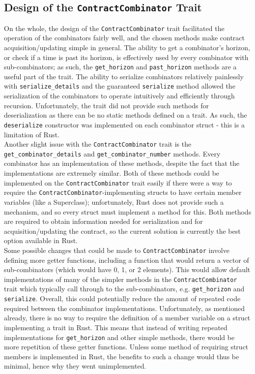 \subsection{Design of the \texttt{ContractCombinator} Trait}

On the whole, the design of the \texttt{ContractCombinator} trait facilitated the operation of the combinators fairly well, and the chosen methods make contract acquisition/updating simple in general. The ability to get a combinator's horizon, or check if a time is past its horizon, is effectively used by every combinator with sub-combinators; as such, the \texttt{get\_horizon} and \texttt{past\_horizon} methods are a useful part of the trait. The ability to serialize combinators relatively painlessly with \texttt{serialize\_details} and the guaranteed \texttt{serialize} method allowed the serialization of the combinators to operate intuitively and efficiently through recursion. Unfortunately, the trait did not provide such methods for deserialization as there can be no static methods defined on a trait. As such, the \texttt{deserialize} constructor was implemented on each combinator struct - this is a limitation of Rust. \\

Another slight issue with the \texttt{ContractCombinator} trait is the \texttt{get\_combinator\_details} and \texttt{get\_combinator\_number} methods. Every combinator has an implementation of these methods, despite the fact that the implementations are extremely similar. Both of these methods could be implemented on the \texttt{ContractCombinator} trait easily if there were a way to require the \texttt{ContractCombinator}-implementing structs to have certain member variables (like a Superclass); unfortunately, Rust does not provide such a mechanism, and so every struct must implement a method for this. Both methods are required to obtain information needed for serialization and for acquisition/updating the contract, so the current solution is currently the best option available in Rust. \\

Some possible changes that could be made to \texttt{ContractCombinator} involve defining more getter functions, including a function that would return a vector of sub-combinators (which would have 0, 1, or 2 elements). This would allow default implementations of many of the simpler methods in the \texttt{ContractCombinator} trait which typically call through to the sub-combinators, e.g. \texttt{get\_horizon} and \texttt{serialize}. Overall, this could potentially reduce the amount of repeated code required between the combinator implementations. Unfortunately, as mentioned already, there is no way to require the definition of a member variable on a struct implementing a trait in Rust. This means that instead of writing repeated implementations for \texttt{get\_horizon} and other simple methods, there would be more repetition of these getter functions. Unless some method of requiring struct members is implemented in Rust, the benefits to such a change would thus be minimal, hence why they went unimplemented. \\

